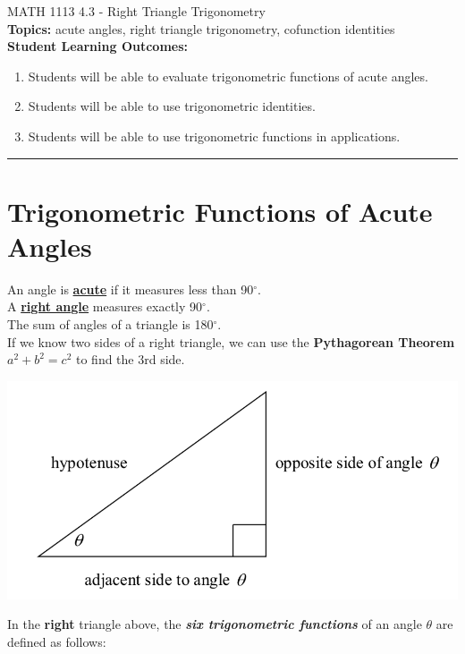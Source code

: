 \documentclass[11pt]{article}
\begin{document}
\noindent MATH 1113   \hfill 4.3 - Right Triangle Trigonometry\\



\noindent \textbf{Topics:}  acute angles, right triangle trigonometry, cofunction identities\\

\noindent \textbf{Student Learning Outcomes:}
\begin{enumerate}
\item Students will be able to evaluate trigonometric functions of acute angles.
\item Students will be able to use trigonometric identities.
\item Students will be able to use trigonometric functions in applications.
\end{enumerate}

\hrule 
\vspace{5mm}
\section{Trigonometric Functions of Acute Angles}
\noindent An angle is \textbf{\underline{acute}} if it measures less than 90$^{\circ}$.\\
A \textbf{\underline{right angle}} measures exactly 90$^{\circ}$.\\
The sum of angles of a triangle is 180$^{\circ}$.\\[.2in]

\noindent If we know two sides of a right triangle, we can use the \textbf{Pythagorean Theorem} $a^2+b^2=c^2$ to find the 3rd side.

\begin{center}
\includegraphics[scale=.6]{righttriangle}\\
\end{center}


In the \textbf{right} triangle above, the \textbf{\emph{six trigonometric functions}} of an angle $\theta$ are defined as follows:
\end{document}
